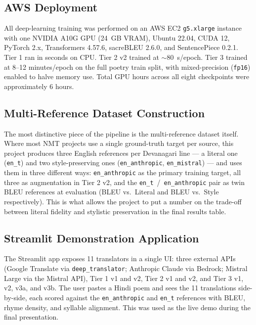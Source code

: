 \documentclass[11pt]{article}
\begin{document}
\subsection{AWS Deployment}
All deep-learning training was performed on an AWS EC2 \texttt{g5.xlarge} instance with one NVIDIA A10G GPU (24~GB VRAM), Ubuntu 22.04, CUDA 12, PyTorch 2.x, Transformers 4.57.6, sacreBLEU 2.6.0, and SentencePiece 0.2.1. Tier 1 ran in seconds on CPU. Tier 2 v2 trained at $\sim$80~s/epoch. Tier 3 trained at 8--12 minutes/epoch on the full poetry train split, with mixed-precision (\texttt{fp16}) enabled to halve memory use. Total GPU hours across all eight checkpoints were approximately 6 hours.

\subsection{Multi-Reference Dataset Construction}
The most distinctive piece of the pipeline is the multi-reference dataset itself. Where most NMT projects use a single ground-truth target per source, this project produces three English references per Devanagari line --- a literal one (\texttt{en\_t}) and two style-preserving ones (\texttt{en\_anthropic}, \texttt{en\_mistral}) --- and uses them in three different ways: \texttt{en\_anthropic} as the primary training target, all three as augmentation in Tier 2 v2, and the \texttt{en\_t}~/~\texttt{en\_anthropic} pair as twin BLEU references at evaluation (BLEU vs.~Literal and BLEU vs.~Style respectively). This is what allows the project to put a number on the trade-off between literal fidelity and stylistic preservation in the final results table.

\subsection{Streamlit Demonstration Application}
The Streamlit app exposes 11 translators in a single UI: three external APIs (Google Translate via \texttt{deep\_translator}; Anthropic Claude via Bedrock; Mistral Large via the Mistral API), Tier 1 v1 and v2, Tier 2 v1 and v2, and Tier 3 v1, v2, v3a, and v3b. The user pastes a Hindi poem and sees the 11 translations side-by-side, each scored against the \texttt{en\_anthropic} and \texttt{en\_t} references with BLEU, rhyme density, and syllable alignment. This was used as the live demo during the final presentation.

\end{document}
